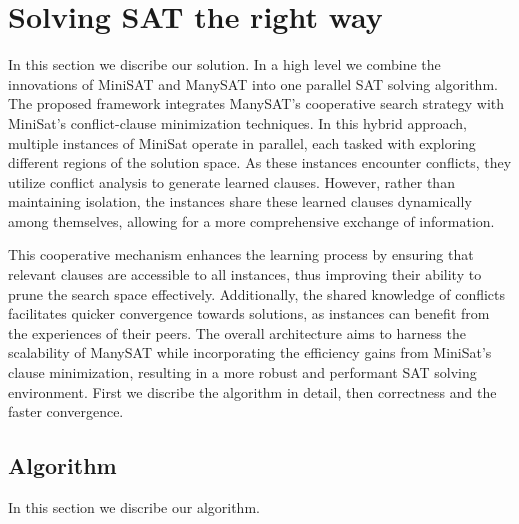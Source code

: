 \documentclass{article}
\begin{document}
\section{Solving SAT the right way}
In this section we discribe our solution. In a high level we combine the innovations of MiniSAT \cite{MiniSAT} and ManySAT \cite{ManySAT} into one parallel SAT solving algorithm. The proposed framework integrates ManySAT's cooperative search strategy with MiniSat's conflict-clause minimization techniques. In this hybrid approach, multiple instances of MiniSat operate in parallel, each tasked with exploring different regions of the solution space. As these instances encounter conflicts, they utilize conflict analysis to generate learned clauses. However, rather than maintaining isolation, the instances share these learned clauses dynamically among themselves, allowing for a more comprehensive exchange of information.

This cooperative mechanism enhances the learning process by ensuring that relevant clauses are accessible to all instances, thus improving their ability to prune the search space effectively. Additionally, the shared knowledge of conflicts facilitates quicker convergence towards solutions, as instances can benefit from the experiences of their peers. The overall architecture aims to harness the scalability of ManySAT while incorporating the efficiency gains from MiniSat's clause minimization, resulting in a more robust and performant SAT solving environment. First we discribe the algorithm in detail, then correctness and the faster convergence.

\subsection{Algorithm}
In this section we discribe our algorithm.
\end{document}
